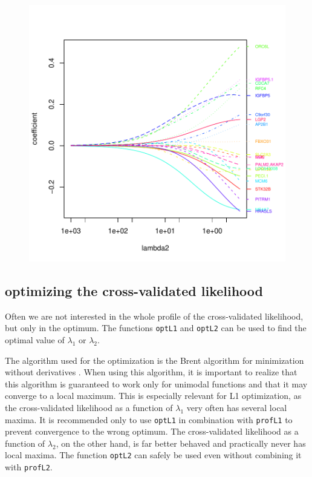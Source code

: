 \documentclass[a4paper]{article}
\newcommand{\Robject}[1]{{\texttt{#1}}}
\newcommand{\Rfunction}[1]{{\texttt{#1}}}
\begin{document}
\begin{figure}
\begin{Schunk}
\end{Schunk}
\includegraphics{penalized-profpathplot}
\end{figure}

\subsection{optimizing the cross-validated likelihood}

Often we are not interested in the whole profile of the cross-validated likelihood, but only in the optimum. The functions \Rfunction{optL1} and \Rfunction{optL2} can be used to find the optimal value of $\lambda_1$ or $\lambda_2$.

The algorithm used for the optimization is the Brent algorithm for minimization without derivatives \citep[][see also \Robject{help(optimize)}]{Brent1973}. When using this algorithm, it is important to realize that this algorithm is guaranteed to work only for unimodal functions and that it may converge to a local maximum. This is especially relevant for L1 optimization, as the cross-validated likelihood as a function of $\lambda_1$ very often has several local maxima. It is recommended only to use \Rfunction{optL1} in combination with \Rfunction{profL1} to prevent convergence to the wrong optimum. The cross-validated likelihood as a function of $\lambda_2$, on the other hand, is far better behaved and practically never has local maxima. The function \Rfunction{optL2} can safely be used even without combining it with \Rfunction{profL2}.
\end{document}
